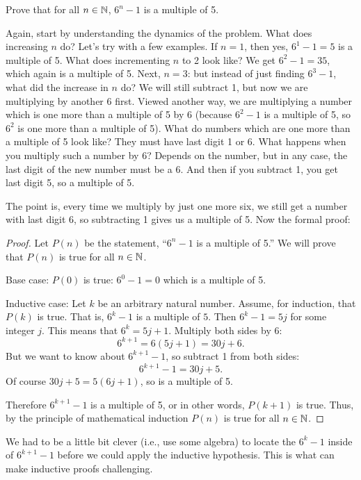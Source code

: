 \documentclass[12pt]{article}
\begin{document}
 \begin{example}
   Prove that for all $n \in \mathbb N$, $6^n - 1$ is a multiple of 5.
   \begin{solution}
   Again, start by understanding the dynamics of the problem.  What does increasing $n$ do?  Let's try with a few examples.  If $n = 1$, then yes, $6^1 - 1 = 5$ is a multiple of 5.  What does incrementing $n$ to 2 look like?  We get $6^2 - 1 = 35$, which again is a multiple of 5.  Next, $n = 3$: but instead of just finding $6^3 - 1$, what did the increase in $n$ do?  We will still subtract 1, but now we are multiplying by another 6 first.  Viewed another way, we are multiplying a number which is one more than a multiple of 5 by 6 (because $6^2 - 1$ is a multiple of 5, so $6^2$ is one more than a multiple of 5).  What do numbers which are one more than a multiple of 5 look like?  They must have last digit 1 or 6.  What happens when you multiply such a number by 6?  Depends on the number, but in any case, the last digit of the new number must be a 6.  And then if you subtract 1, you get last digit 5, so a multiple of 5.

   The point is, every time we multiply by just one more six, we still get a number with last digit 6, so subtracting 1 gives us a multiple of 5. Now the formal proof:

   \begin{proof}
     Let $P(n)$ be the statement, ``$6^n - 1$ is a multiple of 5.''  We will prove that $P(n)$ is true for all $n \in \mathbb N$.

     Base case: $P(0)$ is true: $6^0 -1 = 0$ which is a multiple of 5.

     Inductive case: Let $k$ be an arbitrary natural number.  Assume, for induction, that $P(k)$ is true.  That is, $6^k - 1$ is a multiple of $5$.  Then $6^k - 1 = 5j$ for some integer $j$.  This means that $6^k = 5j + 1$.  Multiply both sides by $6$:
     \[6^{k+1} = 6(5j+1) = 30j + 6.\]
     But we want to know about $6^{k+1} - 1$, so subtract 1 from both sides:
     \[6^{k+1} - 1 = 30j + 5.\]
     Of course $30j+5 = 5(6j+1)$, so is a multiple of 5.

     Therefore $6^{k+1} - 1$ is a multiple of 5, or in other words, $P(k+1)$ is true.  Thus, by the principle of mathematical induction $P(n)$ is true for all $n \in \mathbb N$.
   \end{proof}
   \end{solution}
 \end{example}

We had to be a little bit clever (i.e., use some algebra) to locate the $6^k - 1$ inside of $6^{k+1} - 1$ before we could apply the inductive hypothesis.  This is what can make inductive proofs challenging.
\end{document}
